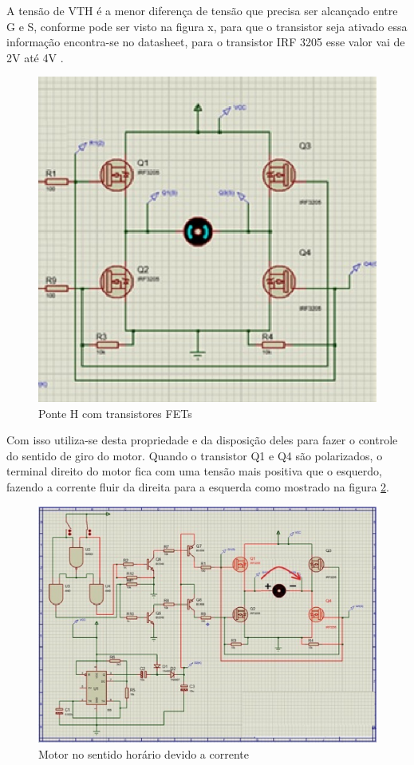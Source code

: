 A tensão de VTH é a menor diferença de tensão que precisa ser alcançado entre G e S, conforme pode ser visto na figura x, para que o transistor seja ativado essa informação encontra-se no datasheet, para o transistor IRF 3205 esse valor vai de 2V até 4V \cite{datasheet_irf_3205}.

\begin{figure}[!htb]
	\centering
	\includegraphics[keepaspectratio=true,scale=1]{figuras/referencialteorico/figurax_1.eps}
	\caption{Ponte H com transistores FETs}
	\label{figx+1}
\end{figure}


Com isso utiliza-se desta propriedade e da disposição deles para fazer o controle do sentido de giro do motor. Quando o transistor Q1 e Q4 são polarizados, o terminal direito do motor fica com uma tensão mais positiva que o esquerdo, fazendo a corrente fluir da direita para a esquerda como mostrado na figura \ref{figx+2}.

\begin{figure}[!htb]
	\centering
	\includegraphics[keepaspectratio=true,scale=0.5]{figuras/referencialteorico/figurax_2.eps}
	\caption{Motor no sentido horário devido a corrente}
	\label{figx+2}
\end{figure}

